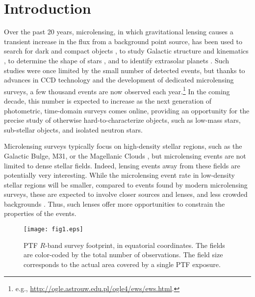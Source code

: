 \documentclass{emulateapj}
\begin{document}
\section{Introduction}
Over the past 20 years, microlensing, in which gravitational lensing causes a transient increase in the flux from a background point source, has been used to search for dark and compact objects \citep{original_macho, oslowski2008, sartore2010}, to study Galactic structure and kinematics \citep{binney2000}, to determine the shape of stars \citep{rattenbury2005}, and to identify extrasolar planets \citep[][and references therein]{gaudi2011}. Such studies were once limited by the small number of detected events, but thanks to advances in CCD technology and the development of dedicated microlensing surveys, a few thousand events are now observed each year.\footnote{e.g., \url{http://ogle.astrouw.edu.pl/ogle4/ews/ews.html}.} In the coming decade, this number is expected to increase as the next generation of photometric, time-domain surveys comes online, providing an opportunity for the precise study of otherwise hard-to-characterize objects, such as low-mass stars, sub-stellar objects, and isolated neutron stars. 

Microlensing surveys typically focus on high-density stellar regions, such as the Galactic Bulge, M31, or the Magellanic Clouds \citep[e.g.,][]{original_ogle, original_macho, eros_original, crotts1996}, but microlensing events are not limited to dense stellar fields. Indeed, lensing events away from these fields are potentially very interesting. While the microlensing event rate in low-density stellar regions will be smaller, compared to events found by modern microlensing surveys, these are expected to involve closer sources and lenses, and less crowded backgrounds \citep{mesolensing1}. Thus, such lenses offer more opportunities to constrain the properties of the events.

\begin{figure*}[!t]
\centering\texttt{[image: fig1.eps]}
\caption{PTF $R$-band survey footprint, in equatorial coordinates. The fields are color-coded by the total number of observations. The field size corresponds to the actual area covered by a single PTF exposure.}\label{fig:survey_footprint}
\end{figure*}	
\end{document}
